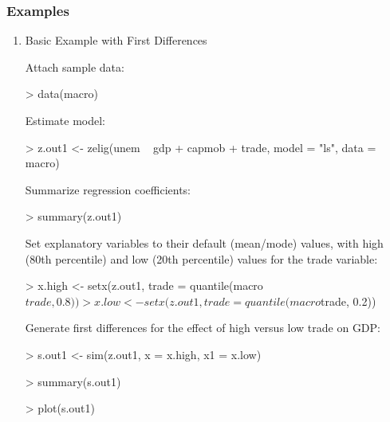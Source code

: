 \subsubsection{Examples}\begin{enumerate}
\item Basic Example with First Differences

Attach sample data:
\begin{Schunk}
\begin{Sinput}
> data(macro)
\end{Sinput}
\end{Schunk}
Estimate model:
\begin{Schunk}
\begin{Sinput}
> z.out1 <- zelig(unem ~ gdp + capmob + trade, model = "ls", data = macro)
\end{Sinput}
\end{Schunk}
Summarize regression coefficients:
\begin{Schunk}
\begin{Sinput}
> summary(z.out1)
\end{Sinput}
\end{Schunk}
Set explanatory variables to their default (mean/mode) values, with
high (80th percentile) and low (20th percentile) values for the trade variable:
\begin{Schunk}
\begin{Sinput}
> x.high <- setx(z.out1, trade = quantile(macro$trade, 0.8))
> x.low <- setx(z.out1, trade = quantile(macro$trade, 0.2))
\end{Sinput}
\end{Schunk}
Generate first differences for the effect of high versus low trade on
GDP:
\begin{Schunk}
\begin{Sinput}
> s.out1 <- sim(z.out1, x = x.high, x1 = x.low)
\end{Sinput}
\end{Schunk}
\begin{Schunk}
\begin{Sinput}
> summary(s.out1)
\end{Sinput}
\end{Schunk}
\begin{center}
\begin{Schunk}
\begin{Sinput}
> plot(s.out1)
\end{Sinput}
\end{Schunk}

\end{center}
\end{enumerate}
